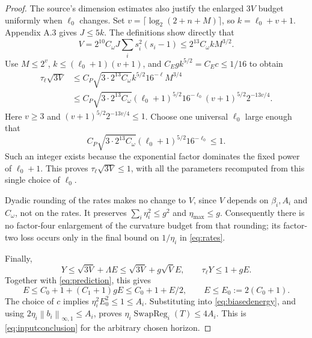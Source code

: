 \documentclass[11pt]{article}
\newcommand{\SwapReg}{\operatorname{SwapReg}}
\newcommand{\norm}[1]{\left\lVert#1\right\rVert}
\newcommand{\rn}[1]{\norm{#1}_{\infty,1}}
\begin{document}
\begin{proof}
The source's dimension estimates also justify the enlarged $3V$
budget uniformly when $\ell_0$ changes.  Set
$v=\lceil\log_2(2+n+M)\rceil$, so $k=\ell_0+v+1$.
Appendix A.3 gives $J\leq5k$.  The definitions show directly that
\[
 V=2^{10}C_\omega J\sum_i s_i^2(s_i-1)
 \leq2^{13}C_\omega kM^{3/2}.
\]
Use $M\leq2^v$, $k\leq(\ell_0+1)(v+1)$, and
$C_Egk^{5/2}=C_Ec\leq1/16$ to obtain
\begin{align*}
 \tau_\ell\sqrt{3V}
 &\leq C_P\sqrt{3\cdot2^{13}C_\omega}
        k^{5/2}16^{-\ell}M^{3/4}\\
 &\leq C_P\sqrt{3\cdot2^{13}C_\omega}
 (\ell_0+1)^{5/2}16^{-\ell_0}
 (v+1)^{5/2}2^{-13v/4}.
\end{align*}
Here $v\geq3$ and $(v+1)^{5/2}2^{-13v/4}\leq1$.
Choose one universal $\ell_0$ large enough that
\[
 C_P\sqrt{3\cdot2^{13}C_\omega}
 (\ell_0+1)^{5/2}16^{-\ell_0}\leq1.
\]
Such an integer exists because the exponential factor dominates the
fixed power of $\ell_0+1$.  This proves
$\tau_\ell\sqrt{3V}\leq1$, with all the parameters recomputed from
this single choice of $\ell_0$.

Dyadic rounding of the rates makes no change to $V$, since $V$
depends on $\beta_i,A_i$ and $C_\omega$, not on the rates.
It preserves $\sum_i\eta_i^2\leq g^2$ and $\eta_{\max}\leq g$.
Consequently there is no factor-four enlargement of the curvature
budget from that rounding; its factor-two loss occurs only in the
final bound on $1/\eta_i$ in \eqref{eq:rates}.

Finally,
\[
 Y\leq\sqrt{3V}+\Lambda E\leq\sqrt{3V}+g\sqrt V E,
 \qquad\tau_\ell Y\leq1+gE.
\]
Together with \eqref{eq:prediction}, this gives
\[
 E\leq C_0+1+(C_1+1)gE\leq C_0+1+E/2,
 \qquad E\leq E_0:=2(C_0+1).
\]
The choice of $c$ implies $\eta_i^2E_0^2\leq1\leq A_i$.
Substituting into \eqref{eq:biasedenergy}, and using
$2\eta_i\rn{b_i}\leq A_i$, proves
$\eta_i\SwapReg_i(T)\leq4A_i$.  This is
\eqref{eq:inputconclusion} for the arbitrary chosen horizon.
\end{proof}
\end{document}
